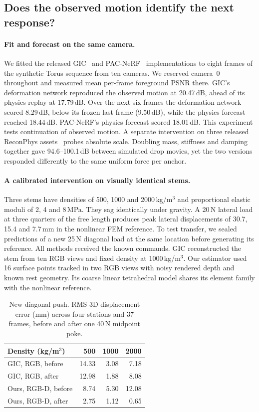 \subsection{Does the observed motion identify the next response?}
\label{sec:interaction-trials}
\paragraph{Fit and forecast on the same camera.}
We fitted the released GIC~\cite{cai2024gic} and PAC-NeRF~\cite{li2023pacnerf} implementations to eight frames of the synthetic Torus sequence from ten cameras. We reserved camera~0 throughout and measured mean per-frame foreground PSNR there. GIC's deformation network reproduced the observed motion at 20.47\,dB, ahead of its physics replay at 17.79\,dB. Over the next six frames the deformation network scored 8.29\,dB, below its frozen last frame (9.50\,dB), while the physics forecast reached 18.44\,dB. PAC-NeRF's physics forecast scored 18.01\,dB. This experiment tests continuation of observed motion. A separate intervention on three released ReconPhys assets~\cite{wang2026reconphys} probes absolute scale. Doubling mass, stiffness and damping together gave 94.6--100.1\,dB between simulated drop movies, yet the two versions responded differently to the same uniform force per anchor.

\paragraph{A calibrated intervention on visually identical stems.}
Three stems have densities of 500, 1000 and 2000\,kg/m$^3$ and proportional elastic moduli of 2, 4 and 8\,MPa. They sag identically under gravity. A 20\,N lateral load at three quarters of the free length produces peak lateral displacements of 30.7, 15.4 and 7.7\,mm in the nonlinear FEM reference. To test transfer, we sealed predictions of a new 25\,N diagonal load at the same location before generating its reference. All methods received the known commands. GIC reconstructed the stem from ten RGB views and fixed density at 1000\,kg/m$^3$. Our estimator used 16 surface points tracked in two RGB views with noisy rendered depth and known rest geometry. Its coarse linear tetrahedral model shares its element family with the nonlinear reference.

\begin{table}[t]
\centering\small
\caption{New diagonal push. RMS 3D displacement error (mm) across four stations and 37 frames, before and after one 40\,N midpoint poke.}
\label{tab:diagonal-push}
\begin{tabular}{@{}lrrr@{}}\toprule
Density (kg/m$^3$) & 500 & 1000 & 2000 \\ \midrule
GIC, RGB, before & 14.33 & 3.08 & 7.18 \\
GIC, RGB, after & 12.98 & 1.88 & 8.08 \\
Ours, RGB-D, before & 8.74 & 5.30 & 12.08 \\
Ours, RGB-D, after & 2.75 & 1.12 & 0.65 \\ \bottomrule
\end{tabular}
\end{table}

